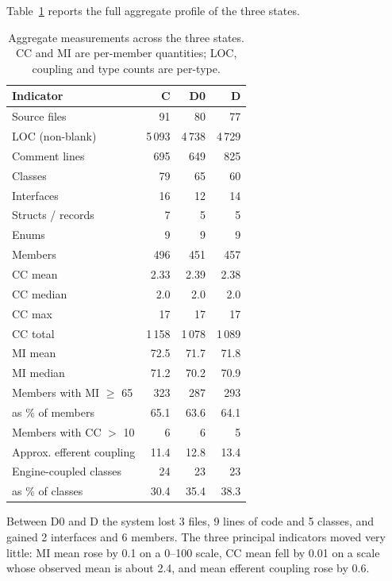 \documentclass{sbc2019}%
\begin{document}
Table~\ref{tab:aggregate} reports the full aggregate profile of the three
states.

\begin{table}[!htbp]
\centering
\caption{Aggregate measurements across the three states. CC and MI are
per-member quantities; LOC, coupling and type counts are per-type.}\label{tab:aggregate}
\small
\begin{tabular}{lrrr}
\toprule
\textbf{Indicator} & \textbf{C} & \textbf{D0} & \textbf{D} \\
\midrule
Source files            & 91    & 80    & 77 \\
LOC (non-blank)         & 5\,093 & 4\,738 & 4\,729 \\
Comment lines           & 695   & 649   & 825 \\
Classes                 & 79    & 65    & 60 \\
Interfaces              & 16    & 12    & 14 \\
Structs / records       & 7     & 5     & 5 \\
Enums                   & 9     & 9     & 9 \\
Members                 & 496   & 451   & 457 \\
\addlinespace
CC mean                 & 2.33  & 2.39  & 2.38 \\
CC median               & 2.0   & 2.0   & 2.0 \\
CC max                  & 17    & 17    & 17 \\
CC total                & 1\,158 & 1\,078 & 1\,089 \\
\addlinespace
MI mean                 & 72.5  & 71.7  & 71.8 \\
MI median               & 71.2  & 70.2  & 70.9 \\
Members with MI $\geq$ 65 & 323 & 287   & 293 \\
\quad as \% of members   & 65.1  & 63.6  & 64.1 \\
Members with CC $>$ 10   & 6     & 6     & 5 \\
\addlinespace
Approx. efferent coupling & 11.4 & 12.8  & 13.4 \\
Engine-coupled classes  & 24    & 23    & 23 \\
\quad as \% of classes  & 30.4  & 35.4  & 38.3 \\
\bottomrule
\end{tabular}
\end{table}

Between D0 and D the system lost 3 files, 9 lines of code and 5 classes, and
gained 2 interfaces and 6 members. The three principal indicators moved very
little: MI mean rose by 0.1 on a 0--100 scale, CC mean fell by 0.01 on a scale
whose observed mean is about 2.4, and mean efferent coupling rose by 0.6.
\end{document}
